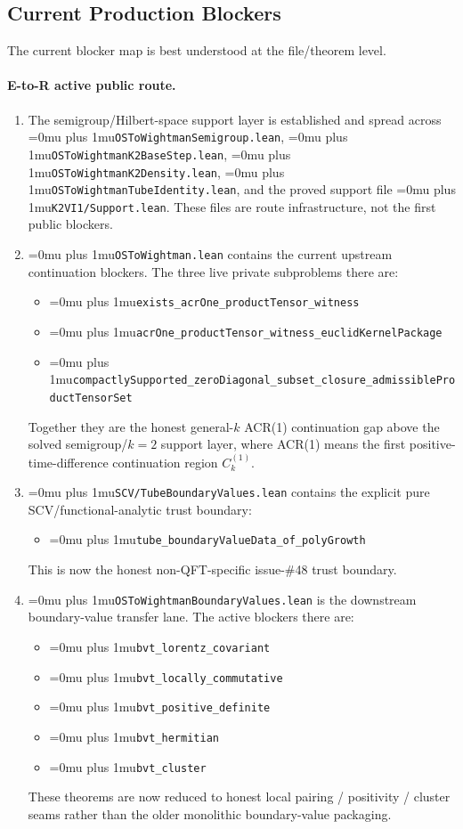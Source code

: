 \documentclass[11pt,a4paper]{article}
\newcommand{\leanfile}[1]{\begingroup\Urlmuskip=0mu plus 1mu\relax\nolinkurl{#1}\endgroup}
\newcommand{\leanname}[1]{\begingroup\Urlmuskip=0mu plus 1mu\relax\nolinkurl{#1}\endgroup}
\begin{document}
\subsection{Current Production Blockers}

The current blocker map is best understood at the file/theorem level.

\paragraph{E-to-R active public route.}
\begin{enumerate}
\item The semigroup/Hilbert-space support layer is established and spread across
  \leanfile{OSToWightmanSemigroup.lean},
  \leanfile{OSToWightmanK2BaseStep.lean},
  \leanfile{OSToWightmanK2Density.lean},
  \leanfile{OSToWightmanTubeIdentity.lean}, and the proved support file
  \leanfile{K2VI1/Support.lean}. These files are route infrastructure, not the
  first public blockers.
\item \leanfile{OSToWightman.lean} contains the current upstream continuation
  blockers. The three live private subproblems there are:
  \begin{itemize}
  \item \leanname{exists\_acrOne\_productTensor\_witness}
  \item \leanname{acrOne\_productTensor\_witness\_euclidKernelPackage}
  \item \leanname{compactlySupported\_zeroDiagonal\_subset\_closure\_admissibleProductTensorSet}
  \end{itemize}
  Together they are the honest general-$k$ ACR(1) continuation gap above the
  solved semigroup/$k=2$ support layer, where ACR(1) means the first
  positive-time-difference continuation region \(C_k^{(1)}\).
\item \leanfile{SCV/TubeBoundaryValues.lean} contains the explicit pure
  SCV/functional-analytic trust boundary:
  \begin{itemize}
  \item \leanname{tube\_boundaryValueData\_of\_polyGrowth}
  \end{itemize}
  This is now the honest non-QFT-specific issue-\#48 trust boundary.
\item \leanfile{OSToWightmanBoundaryValues.lean} is the downstream
  boundary-value transfer lane. The active blockers there are:
  \begin{itemize}
  \item \leanname{bvt\_lorentz\_covariant}
  \item \leanname{bvt\_locally\_commutative}
  \item \leanname{bvt\_positive\_definite}
  \item \leanname{bvt\_hermitian}
  \item \leanname{bvt\_cluster}
  \end{itemize}
  These theorems are now reduced to honest local pairing / positivity /
  cluster seams rather than the older monolithic boundary-value packaging.
\end{enumerate}
\end{document}
